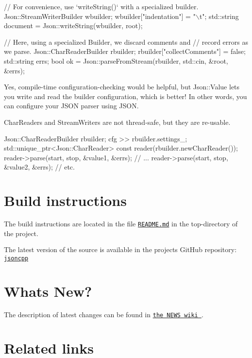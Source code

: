 \begin{DoxyCode}
\textcolor{comment}{// For convenience, use `writeString()` with a specialized builder.}
Json::StreamWriterBuilder wbuilder;
wbuilder[\textcolor{stringliteral}{"indentation"}] = \textcolor{stringliteral}{"\(\backslash\)t"};
std::string document = Json::writeString(wbuilder, root);

\textcolor{comment}{// Here, using a specialized Builder, we discard comments and}
\textcolor{comment}{// record errors as we parse.}
Json::CharReaderBuilder rbuilder;
rbuilder[\textcolor{stringliteral}{"collectComments"}] = \textcolor{keyword}{false};
std::string errs;
\textcolor{keywordtype}{bool} ok = Json::parseFromStream(rbuilder, std::cin, &root, &errs);
\end{DoxyCode}


Yes, compile-\/time configuration-\/checking would be helpful, but {\ttfamily Json\+::\+Value} lets you write and read the builder configuration, which is better! In other words, you can configure your J\+S\+ON parser using J\+S\+ON.

Char\+Readers and Stream\+Writers are not thread-\/safe, but they are re-\/usable. 
\begin{DoxyCode}
Json::CharReaderBuilder rbuilder;
cfg >> rbuilder.settings\_;
std::unique\_ptr<Json::CharReader> \textcolor{keyword}{const} reader(rbuilder.newCharReader());
reader->parse(start, stop, &value1, &errs);
\textcolor{comment}{// ...}
reader->parse(start, stop, &value2, &errs);
\textcolor{comment}{// etc.}
\end{DoxyCode}
\hypertarget{index__pbuild}{}\section{Build instructions}\label{index__pbuild}
The build instructions are located in the file \href{https://github.com/open-source-parsers/jsoncpp/blob/master/README.md}{\tt R\+E\+A\+D\+M\+E.\+md} in the top-\/directory of the project.

The latest version of the source is available in the project\textquotesingle{}s Git\+Hub repository\+: \href{https://github.com/open-source-parsers/jsoncpp/}{\tt jsoncpp}\hypertarget{index__news}{}\section{What\textquotesingle{}s New?}\label{index__news}
The description of latest changes can be found in \href{https://github.com/open-source-parsers/jsoncpp/wiki/NEWS}{\tt the N\+E\+WS wiki }.\hypertarget{index__rlinks}{}\section{Related links}\label{index__rlinks}


